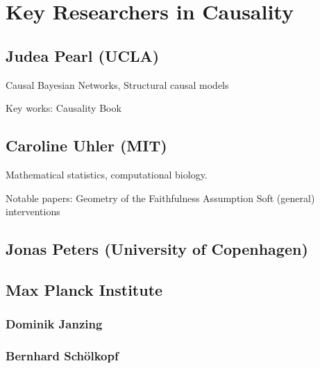 \section{Key Researchers in Causality}

\subsection{Judea Pearl (UCLA)}

Causal Bayesian Networks, Structural causal models

Key works:
Causality Book \cite{pearl_causality:_2009}


\subsection{Caroline Uhler (MIT)}

Mathematical statistics, computational biology.

Notable papers:
Geometry of the Faithfulness Assumption \cite{uhler_geometry_2013}
Soft (general) interventions \cite{yang_characterizing_2018}

\subsection{Jonas Peters (University of Copenhagen)}

\subsection{Max Planck Institute}

\subsubsection{Dominik Janzing}

\subsubsection{Bernhard Sch\"olkopf}